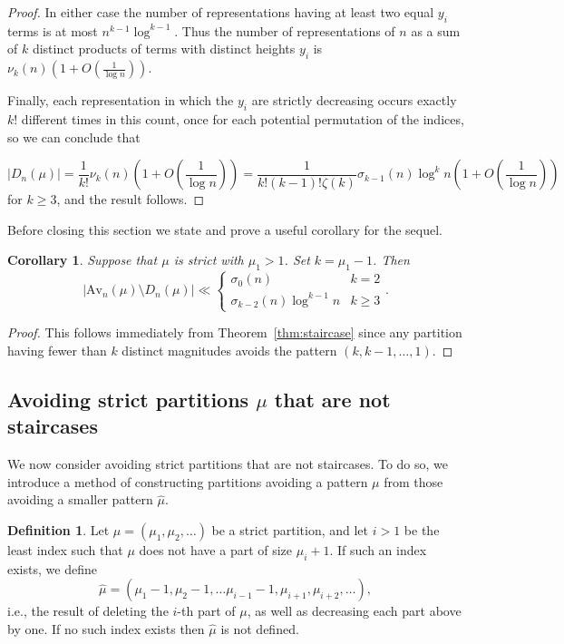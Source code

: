 \documentclass{article}
\theoremstyle{plain}
\newtheorem{corollary}[theorem]{Corollary}
\theoremstyle{definition}
\newtheorem{definition}[theorem]{Definition}
\newcommand{\Av}{\text{Av}}
\begin{document}
\begin{proof}
In either case the number of representations having at least two equal $y_i$ terms is at most $n^{k-1}\log^{k-1}$. Thus the number of representations of $n$ as a sum of $k$ distinct products of terms with distinct heights $y_i$ is $\nu_k(n)\left(1+O\left(\frac{1}{\log n}\right)\right)$. 


Finally, each representation in which the $y_i$ are strictly decreasing occurs exactly $k!$ different times in this count, once for each potential permutation of the indices, so we can conclude that

\[|D_n(\mu)| = \frac{1}{k!} \nu_k(n)\left(1+O\left(\frac{1}{\log n}\right)\right) = \frac{1}{k!(k-1)!\zeta(k)}\sigma_{k-1}(n)\log^k n\left(1+O\left(\frac{1}{\log n}\right)\right)\] for $k\geq 3$, and the result follows.
\end{proof}

Before closing this section we state and prove a useful corollary for the sequel.  

\begin{corollary}\label{cor:fewerparts}
    Suppose that $\mu$ is strict with $\mu_1>1$. Set $k = \mu_1-1$.   Then $$|\Av_n(\mu)\setminus D_n(\mu)| \ll \begin{cases} \sigma_0(n) & k=2 \\
    \sigma_{k-2}(n)\log^{k-1} n & k \geq 3 \end{cases}.$$ 
\end{corollary}
\begin{proof}
This follows immediately from Theorem~\ref{thm:staircase} since any partition having fewer than $k$ distinct magnitudes avoids the pattern $(k,k-1,\ldots, 1)$.
\end{proof}



\subsection{Avoiding strict partitions $\mu$ that are not staircases}\label{ssec:not staircase}


We now consider avoiding strict partitions that are not staircases.  To do so, we introduce a method of constructing partitions avoiding a pattern $\mu$ from those avoiding a smaller pattern $\hat \mu$.

\begin{definition}
	Let $\mu=(\mu_1,\mu_2,\ldots)$ be a strict partition, and let $i>1$ be the least index such that  $\mu$ does not have a part of size $\mu_i+1$.  If such an index exists, we define 
	$$\hat\mu = (\mu_1-1,\mu_2-1, \ldots \mu_{i-1}-1, \mu_{i+1}, \mu_{i+2},\ldots),$$ 
	i.e., the result of deleting the $i$-th part of $\mu$, as well as decreasing each part above by one.  If no such index exists then $\hat \mu$ is not defined.  
\end{definition}
\end{document}
